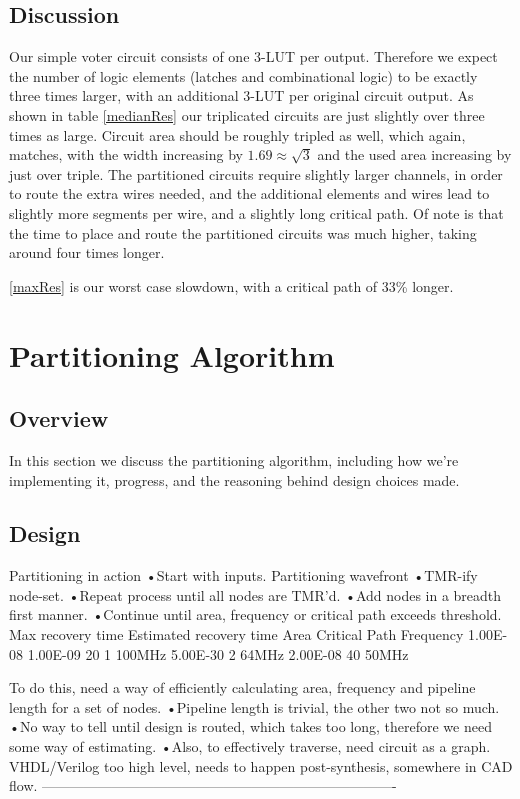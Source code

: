 \documentclass[12pt,drafta4paper,oneside]{memoir} %
\begin{document}
\section{Discussion}
Our simple voter circuit consists of one 3-\ac{LUT} per output. Therefore we expect the number of logic elements (latches and combinational logic) to be exactly three times larger, with an additional 3-\ac{LUT} per original circuit output. As shown in table \ref{medianRes} our triplicated circuits are just slightly over three times as large. Circuit area should be roughly tripled as well, which again, matches, with the width increasing by $1.69 \approx \sqrt{3}$ and the used area increasing by just over triple. The partitioned circuits require slightly larger channels, in order to route the extra wires needed, and the additional elements and wires lead to slightly more segments per wire, and a slightly long critical path. Of note is that the time to place and route the partitioned circuits was much higher, taking around four times longer.

\ref{maxRes} is our worst case slowdown, with a critical path of 33\% longer.



\chapter{Partitioning Algorithm}
\section{Overview}
In this section we discuss the partitioning algorithm, including how we're implementing it, progress, and the reasoning behind design choices made.
\section{Design}
Partitioning in action
•Start with inputs.
Partitioning wavefront
•TMR-ify node-set.
•Repeat process until all nodes are TMR’d.
•Add nodes in a breadth first manner.
•Continue until area, frequency or critical path exceeds threshold.
Max recovery time
Estimated recovery time
Area
Critical Path
Frequency
1.00E-08
1.00E-09
20
1
100MHz
5.00E-30
2
64MHz
2.00E-08
40
50MHz

To do this, need a way of efficiently calculating area, frequency and pipeline length for a set of nodes.
•Pipeline length is trivial, the other two not so much.
•No way to tell until design is routed, which takes too long, therefore we need some way of estimating.
•Also, to effectively traverse, need circuit as a graph. VHDL/Verilog too high level, needs to happen post-synthesis, somewhere in CAD flow.
----------------------------------------------------------------------------
\end{document}
